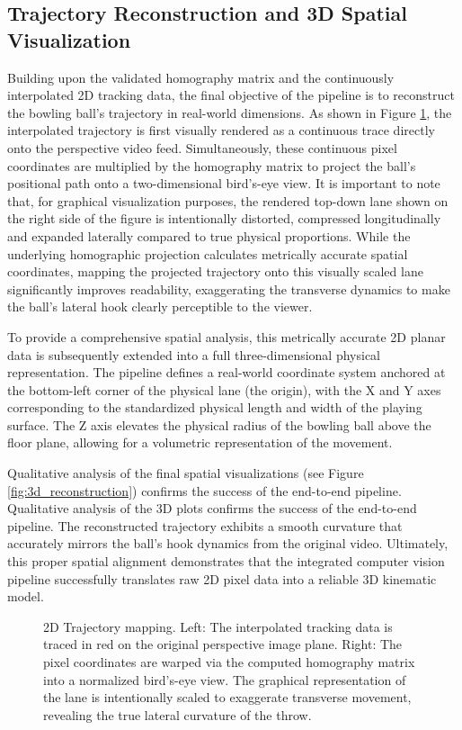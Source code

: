 \subsection{Trajectory Reconstruction and 3D Spatial Visualization}

Building upon the validated homography matrix and the continuously interpolated 2D tracking data, the final objective of the pipeline is to reconstruct the bowling ball's trajectory in real-world dimensions. As shown in Figure \ref{fig:2d_trajectory}, the interpolated trajectory is first visually rendered as a continuous trace directly onto the perspective video feed. Simultaneously, these continuous pixel coordinates are multiplied by the homography matrix to project the ball's positional path onto a two-dimensional bird's-eye view. It is important to note that, for graphical visualization purposes, the rendered top-down lane shown on the right side of the figure is intentionally distorted, compressed longitudinally and expanded laterally compared to true physical proportions. While the underlying homographic projection calculates metrically accurate spatial coordinates, mapping the projected trajectory onto this visually scaled lane significantly improves readability, exaggerating the transverse dynamics to make the ball's lateral hook clearly perceptible to the viewer.

To provide a comprehensive spatial analysis, this metrically accurate 2D planar data is subsequently extended into a full three-dimensional physical representation. The pipeline defines a real-world coordinate system anchored at the bottom-left corner of the physical lane (the origin), with the X and Y axes corresponding to the standardized physical length and width of the playing surface. The Z axis elevates the physical radius of the bowling ball above the floor plane, allowing for a volumetric representation of the movement.

Qualitative analysis of the final spatial visualizations (see Figure \ref{fig:3d_reconstruction}) confirms the success of the end-to-end pipeline. Qualitative analysis of the 3D plots confirms the success of the end-to-end pipeline. The reconstructed trajectory exhibits a smooth curvature that accurately mirrors the ball's hook dynamics from the original video. Ultimately, this proper spatial alignment demonstrates that the integrated computer vision pipeline successfully translates raw 2D pixel data into a reliable 3D kinematic model.

\begin{figure}[htbp]
    \centering
    \caption{2D Trajectory mapping. Left: The interpolated tracking data is traced in red on the original perspective image plane. Right: The pixel coordinates are warped via the computed homography matrix into a normalized bird's-eye view. The graphical representation of the lane is intentionally scaled to exaggerate transverse movement, revealing the true lateral curvature of the throw.}
    \label{fig:2d_trajectory}
\end{figure}

